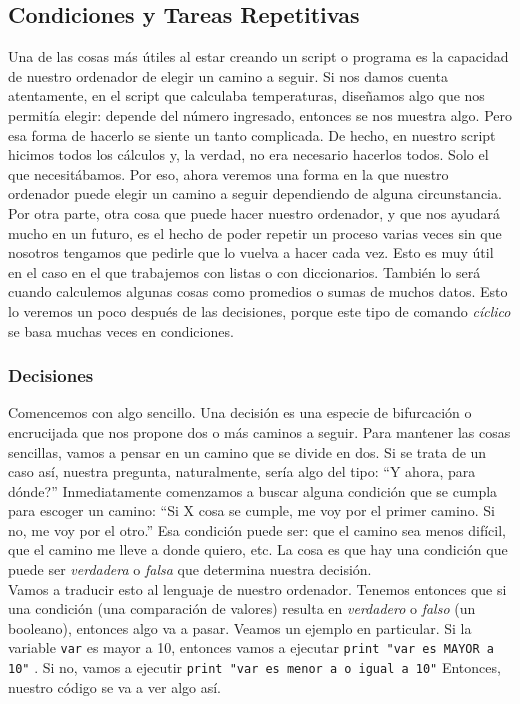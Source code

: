 \documentclass[10pt,letterpaper]{article}
\newcommand{\inlinecode}[1]{
\colorbox{light-gray}{\texttt{#1}}
}
\begin{document}
\subsection{Condiciones y Tareas Repetitivas}
Una de las cosas m\'as \'utiles al estar creando un script o programa es la capacidad de nuestro ordenador de elegir un camino a seguir. Si nos damos cuenta atentamente, en el script que calculaba temperaturas, dise\~namos algo que nos permit\'ia elegir: depende del n\'umero ingresado, entonces se nos muestra algo. Pero esa forma de hacerlo se siente un tanto complicada. De hecho, en nuestro script hicimos todos los c\'alculos y, la verdad, no era necesario hacerlos todos. Solo el que necesit\'abamos. Por eso, ahora veremos una forma en la que nuestro ordenador puede elegir un camino a seguir dependiendo de alguna circunstancia.\\

Por otra parte, otra cosa que puede hacer nuestro ordenador, y que nos ayudar\'a mucho en un futuro, es el hecho de poder repetir un proceso varias veces sin que nosotros tengamos que pedirle que lo vuelva a hacer cada vez. Esto es muy \'util en el caso en el que trabajemos con listas o con diccionarios. Tambi\'en lo ser\'a cuando calculemos algunas cosas como promedios o sumas de muchos datos. Esto lo veremos un poco despu\'es de las decisiones, porque este tipo de comando \emph{c\'iclico} se basa muchas veces en condiciones.

\subsubsection{Decisiones}
Comencemos con algo sencillo. Una decisi\'on es una especie de bifurcaci\'on o encrucijada que nos propone dos o m\'as caminos a seguir. Para mantener las cosas sencillas, vamos a pensar en un camino que se divide en dos. Si se trata de un caso as\'i, nuestra pregunta, naturalmente, ser\'ia algo del tipo: ``Y ahora, para d\'onde?'' Inmediatamente comenzamos a buscar alguna condici\'on que se cumpla para escoger un camino: ``Si X cosa se cumple, me voy por el primer camino. Si no, me voy por el otro.'' Esa condici\'on puede ser: que el camino sea menos dif\'icil, que el camino me lleve a donde quiero, etc. La cosa es que hay una condici\'on que puede ser \emph{verdadera} o \emph{falsa} que determina nuestra decisi\'on.\\

Vamos a traducir esto al lenguaje de nuestro ordenador. Tenemos entonces que si una condici\'on (una comparaci\'on de valores) resulta en \emph{verdadero} o \emph{falso} (un booleano), entonces algo va a pasar. Veamos un ejemplo en particular. Si la variable \inlinecode{var} es mayor a 10, entonces vamos a ejecutar \inlinecode{print "var es MAYOR a 10"}. Si no, vamos a ejecutir \inlinecode{print "var es menor a o igual a 10"} Entonces, nuestro c\'odigo se va a ver algo as\'i.
\end{document}
